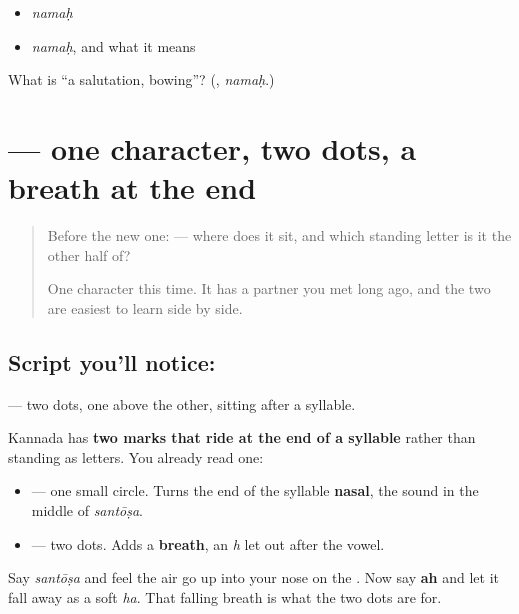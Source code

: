 \begin{itemize}
\raggedright
  \item \emph{namaḥ}
  \item \emph{namaḥ}, and what it means
\end{itemize}

\begin{tcolorbox}[breakable,colback=teal!4,colframe=teal!35!black,title={Before you move on}]
What is \textquotedblleft{}a salutation, bowing\textquotedblright{}? (\textbf{}, \emph{namaḥ}.)
\end{tcolorbox}
\section[\texorpdfstring{\kn{ಃ} (visarga)}{ಃ (visarga)}]{ — one character, two dots, a breath at the end}

\label{lesson:KA-S132-sign-visarga}



\begin{quote}
Before the new one:  — where does it sit, and which standing letter is it the other half of?

One character this time. It has a partner you met long ago, and the two are easiest to learn side by side.
\end{quote}

\subsection*{Script you'll notice: }
\textbf{} — two dots, one above the other, sitting after a syllable.

Kannada has \textbf{two marks that ride at the end of a syllable} rather than standing as letters. You already read one:

\begin{itemize}
\raggedright
  \item \textbf{} — one small circle. Turns the end of the syllable \textbf{nasal}, the sound in the middle of \textbf{} \emph{santōṣa}.
  \item \textbf{} — two dots. Adds a \textbf{breath}, an \emph{h} let out after the vowel.
\end{itemize}

Say \emph{santōṣa} and feel the air go up into your nose on the \textbf{}. Now say \textbf{ah} and let it fall away as a soft \emph{ha}. That falling breath is what the two dots are for.

